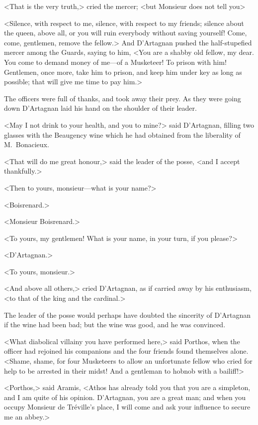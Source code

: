 <That is the very truth,> cried the mercer; <but Monsieur does not tell you\longdash> 

<Silence, with respect to me, silence, with respect to my friends; silence about the queen, above all, or you will ruin everybody without saving yourself! Come, come, gentlemen, remove the fellow.> And D'Artagnan pushed the half-stupefied mercer among the Guards, saying to him, <You are a shabby old fellow, my dear. You come to demand money of me—of a Musketeer! To prison with him! Gentlemen, once more, take him to prison, and keep him under key as long as possible; that will give me time to pay him.> 

The officers were full of thanks, and took away their prey. As they were going down D'Artagnan laid his hand on the shoulder of their leader. 

<May I not drink to your health, and you to mine?> said D'Artagnan, filling two glasses with the Beaugency wine which he had obtained from the liberality of M.~Bonacieux. 

<That will do me great honour,> said the leader of the posse, <and I accept thankfully.> 

<Then to yours, monsieur—what is your name?> 

<Boisrenard.> 

<Monsieur Boisrenard.> 

<To yours, my gentlemen! What is your name, in your turn, if you please?> 

<D'Artagnan.> 

<To yours, monsieur.> 

<And above all others,> cried D'Artagnan, as if carried away by his enthusiasm, <to that of the king and the cardinal.> 

The leader of the posse would perhaps have doubted the sincerity of D'Artagnan if the wine had been bad; but the wine was good, and he was convinced. 

<What diabolical villainy you have performed here,> said Porthos, when the officer had rejoined his companions and the four friends found themselves alone. <Shame, shame, for four Musketeers to allow an unfortunate fellow who cried for help to be arrested in their midst! And a gentleman to hobnob with a bailiff!> 

<Porthos,> said Aramis, <Athos has already told you that you are a simpleton, and I am quite of his opinion. D'Artagnan, you are a great man; and when you occupy Monsieur de Tréville's place, I will come and ask your influence to secure me an abbey.> 

